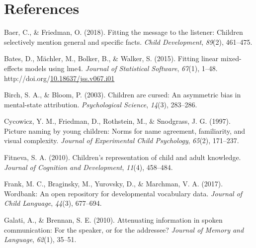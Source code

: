 \documentclass[10pt, letterpaper]{article}
\newenvironment{CSLReferences}%
  {}%
  {\par}
\begin{document}
\vspace{1em} 

\hypertarget{references}{%
\section{References}\label{references}}

\setlength{\parindent}{-0.1in} 
\setlength{\leftskip}{0.125in}

\noindent

\hypertarget{refs}{}
\begin{CSLReferences}{1}{0}
\leavevmode\hypertarget{ref-baer2018}{}%
Baer, C., \& Friedman, O. (2018). Fitting the message to the listener:
Children selectively mention general and specific facts. \emph{Child
Development}, \emph{89}(2), 461--475.

\leavevmode\hypertarget{ref-bates2015}{}%
Bates, D., Mächler, M., Bolker, B., \& Walker, S. (2015). Fitting linear
mixed-effects models using {lme4}. \emph{Journal of Statistical
Software}, \emph{67}(1), 1--48.
http://doi.org/\href{https://doi.org/10.18637/jss.v067.i01}{10.18637/jss.v067.i01}

\leavevmode\hypertarget{ref-birch2003}{}%
Birch, S. A., \& Bloom, P. (2003). Children are cursed: An asymmetric
bias in mental-state attribution. \emph{Psychological Science},
\emph{14}(3), 283--286.

\leavevmode\hypertarget{ref-cycowicz1997}{}%
Cycowicz, Y. M., Friedman, D., Rothstein, M., \& Snodgrass, J. G.
(1997). Picture naming by young children: Norms for name agreement,
familiarity, and visual complexity. \emph{Journal of Experimental Child
Psychology}, \emph{65}(2), 171--237.

\leavevmode\hypertarget{ref-fitneva2010}{}%
Fitneva, S. A. (2010). Children's representation of child and adult
knowledge. \emph{Journal of Cognition and Development}, \emph{11}(4),
458--484.

\leavevmode\hypertarget{ref-frank2017}{}%
Frank, M. C., Braginsky, M., Yurovsky, D., \& Marchman, V. A. (2017).
Wordbank: An open repository for developmental vocabulary data.
\emph{Journal of Child Language}, \emph{44}(3), 677--694.

\leavevmode\hypertarget{ref-galati2010}{}%
Galati, A., \& Brennan, S. E. (2010). Attenuating information in spoken
communication: For the speaker, or for the addressee? \emph{Journal of
Memory and Language}, \emph{62}(1), 35--51.


\end{CSLReferences}
\end{document}
